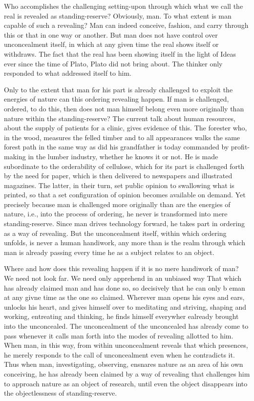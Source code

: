 Who accomplishes the challenging setting-upon through which what we call the real is revealed as standing-reserve? Obviously, man. To what extent is man capable of such a revealing? Man can indeed conceive, fashion, and carry through this or that in one way or another. But man does not have control over unconcealment itself, in which at any given time the real shows itself or withdraws. The fact that the real has been showing itself in the light of Ideas ever since the time of Plato, Plato did not bring about. The thinker only responded to what addressed itself to him.

Only to the extent that man for his part is already challenged to exploit the energies of nature can this ordering revealing happen. If man is challenged, ordered, to do this, then does not man himself belong even more originally than nature within the standing-reserve? The current talk about human resources, about the supply of patients for a clinic, gives evidence of this. The forester who, in the wood, measures the felled timber and to all appearances walks the same forest path in the same way as did his grandfather is today commanded by profit-making in the lumber industry, whether he knows it or not. He is made subordinate to the orderability of cellulose, which for its part is challenged forth by the need for paper, which is then delivered to newspapers and illustrated magazines. The latter, in their turn, set public opinion to swallowing what is printed, so that a set configuration of opinion becomes available on demand. Yet precisely because man is challenged more originally than are the energies of nature, i.e., into the process of ordering, he never is transformed into mere standing-reserve. Since man drives technology forward, he takes part in ordering as a way of revealing. But the unconcealment itself, within which ordering unfolds, is never a human handiwork, any more than is the realm through which man is already passing every time he as a subject relates to an object.

Where and how does this revealing happen if it is no mere handiwork of man? We need not look far. We need only apprehend in an unbiased way That which has already claimed man and has done so, so decisively that he can only b eman at any givne time as the one so claimed. Wherever man opens his eyes and ears, unlocks his heart, and gives himself over to meditating and striving, shaping and working, entreating and thinking, he finds himself everywher ealready brought into the unconcealed. The unconcealment of the unconcealed has already come to pass whenever it calls man forth into the modes of revealing allotted to him. When man, in this way, from within unconcealment reveals that which presences, he merely responds to the call of unconcealment even when he contradicts it. Thus when man, investigating, observing, ensnares nature as an area of his own conceiving, he has already been claimed by a way  of revealing that challenges him to approach nature as an object of research, until even the object disappears into the objectlessness of standing-reserve.

